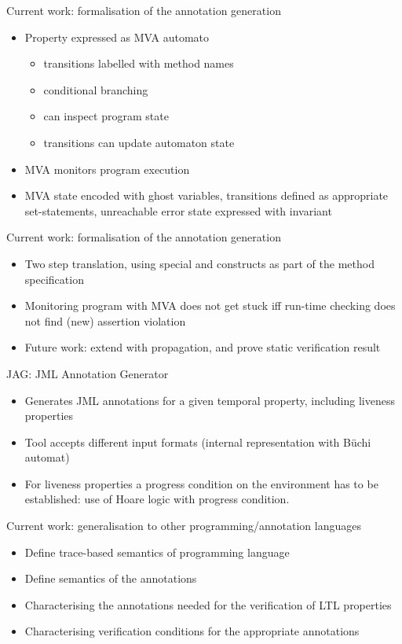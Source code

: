 \documentclass[final,nocolorBG,a4,marieke,nototal,ps, accumulate,slideColor]{prosper}
\begin{document}
\begin{slide}{Current work: formalisation of the annotation
generation}
\begin{itemize}
\item Property expressed as MVA automato
\begin{itemize}
\item transitions labelled with method names
\item conditional branching
\item can inspect program state
\item transitions can update automaton state
\end{itemize}
\item MVA monitors program execution
\item MVA state encoded with ghost variables, transitions defined as
appropriate set-statements, unreachable error state expressed with
invariant
\end{itemize}
\end{slide}


\begin{slide}{Current work: formalisation of the annotation
generation}
\begin{itemize}
\item Two step translation, using special  and
 constructs as part of the method specification
\item Monitoring program with MVA does not get stuck iff run-time
checking does not find (new) assertion violation
\item Future work: extend with propagation, and prove static
verification result
\end{itemize}
\end{slide}

\begin{slide}{JAG: JML Annotation Generator}
\begin{itemize}
\item Generates JML annotations for a given temporal property,
including liveness properties
\item Tool accepts different input formats (internal representation
with B\"uchi automat)
\item For liveness properties a progress condition on the environment
has to be established: use of Hoare logic with progress condition.
\end{itemize}
\end{slide}

\begin{slide}{Current work: generalisation to other
programming/annotation languages}
\begin{itemize}
\item Define trace-based semantics of programming language
\item Define semantics of the annotations
\item Characterising the annotations needed for the verification of
LTL properties
\item Characterising verification conditions for the appropriate
annotations
\end{itemize}
\end{slide}
\end{document}

